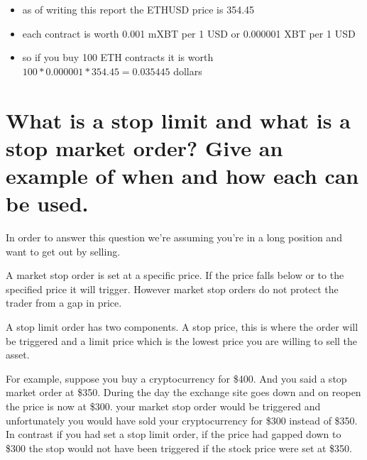 \begin{itemize}
\item as of writing this report the ETHUSD price is 354.45
\item each contract is worth 0.001 mXBT per 1 USD or 0.000001 XBT per 1 USD
\item so if you buy 100 ETH contracts it is worth $ 100 * 0.000001 *354.45 =0.035445 $ dollars
\end{itemize}

    
    
\section{ What is a stop limit and what is a stop market order? Give an example of when and how each can be used.}
    
    In order to answer this question we're assuming you're in a long position and want to get out by selling.

A market stop order is set at a specific price. If the price falls below or to the specified price it will trigger. However market stop orders do not protect the trader from a gap in price. 

A stop limit order has two components.  A stop price, this is where the order will be triggered and a limit price which is the lowest price you are willing to sell the asset. 

For example, suppose you buy a cryptocurrency for \$400. And you said a stop market order at \$350.  During the day the exchange site goes down  and on reopen the price is now at \$300.  your market stop order would be triggered and unfortunately you would have sold your cryptocurrency for \$300 instead of \$350.  In contrast if you had set a stop limit order,  if the price had gapped down to \$300 the stop would not have been triggered if the stock price were set at \$350. 
